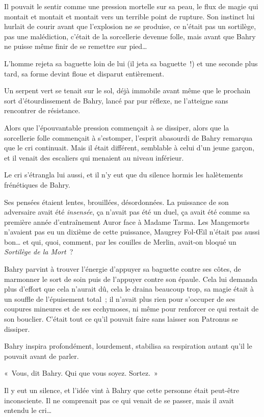 Il pouvait le sentir comme une pression mortelle sur sa peau, le flux de magie qui montait et montait et montait vers un terrible point de rupture.
Son instinct lui hurlait de courir avant que l'explosion ne se produise, ce n'était pas un sortilège, pas une malédiction, c'était de la sorcellerie devenue folle, mais avant que Bahry ne puisse même finir de se remettre sur pied…

L'homme rejeta sa baguette loin de lui (il jeta sa baguette~!) et une seconde plus tard, sa forme devint floue et disparut entièrement.

Un serpent vert se tenait sur le sol, déjà immobile avant même que le prochain sort d'étourdissement de Bahry, lancé par pur réflexe, ne l'atteigne sans rencontrer de résistance.

Alors que l'épouvantable pression commençait à se dissiper, alors que la sorcellerie folle commençait à s'estomper, l'esprit abasourdi de Bahry remarqua que le cri continuait.
Mais il était différent, semblable à celui d'un jeune garçon, et il venait des escaliers qui menaient au niveau inférieur.

Le cri s'étrangla lui aussi, et il n'y eut que du silence hormis les halètements frénétiques de Bahry.

Ses pensées étaient lentes, brouillées, désordonnées.
La puissance de son adversaire avait été \emph{insensée}, ça n'avait pas été un duel, ça avait été comme sa première année d'entraînement Auror face à Madame Tarma.
Les Mangemorts n'avaient pas eu un dixième de cette puissance, Maugrey Fol-Œil n'était pas aussi bon… et qui, quoi, comment, par les couilles de Merlin, avait-on bloqué un \emph{Sortilège de la Mort}~?

Bahry parvint à trouver l'énergie d'appuyer sa baguette contre ses côtes, de marmonner le sort de soin puis de l'appuyer contre son épaule.
Cela lui demanda plus d'effort que cela n'aurait dû, cela le draina beaucoup trop, sa magie était à un souffle de l'épuisement total~; il n'avait plus rien pour s'occuper de ses coupures mineures et de ses ecchymoses, ni même pour renforcer ce qui restait de son bouclier.
C'était tout ce qu'il pouvait faire sans laisser son Patronus se dissiper.

Bahry inspira profondément, lourdement, stabilisa sa respiration autant qu'il le pouvait avant de parler.

«~Vous, dit Bahry.
Qui que vous soyez.
Sortez.~»

Il y eut un silence, et l'idée vint à Bahry que cette personne était peut-être inconsciente.
Il ne comprenait pas ce qui venait de se passer, mais il avait entendu le cri…


